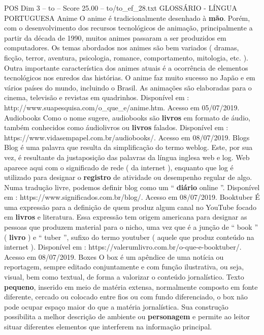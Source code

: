 \begin{textsample}{POS Dim 3 – to – Score 25.00 – to/to\_ef\_28.txt}  \label{ex:f3_pos_105}
GLOSSÁRIO - LÍNGUA PORTUGUESA Anime O anime é tradicionalmente desenhado à \textbf{mão}.
Porém, com o desenvolvimento dos recursos tecnológicos de animação, principalmente a partir da década de 1990, muitos animes passaram a ser produzidos em computadores.
Os temas abordados nos animes são bem variados ( dramas, ficção, terror, aventura, psicologia, romance, comportamento, mitologia, etc. ).
Outra importante característica dos animes atuais é a ocorrência de elementos tecnológicos nos enredos das histórias.
O anime faz muito sucesso no Japão e em vários países do mundo, incluindo o Brasil.
As animações são elaboradas para o cinema, televisão e revistas em quadrinhos.
Disponível em : http://www.suapesquisa.com/o\_que\_e/anime.htm.
Acesso em 05/07/2019.
Audiobooks Como o nome sugere, audiobooks são \textbf{livros} em formato de áudio, também conhecidos como áudiolivros ou \textbf{livros} falados.
Disponível em : https://www.vidasempapel.com.br/audiobooks/.
Acesso em 08/07/2019.
Blogs Blog é uma palavra que resulta da simplificação do termo weblog.
Este, por sua vez, é resultante da justaposição das palavras da língua inglesa web e log.
Web aparece aqui com o significado de rede ( da internet ), enquanto que log é utilizado para designar o \textbf{registro} de atividade ou desempenho regular de algo.
Numa tradução livre, podemos definir blog como um “ \textbf{diário} online ”.
Disponível em : https://www.significados.com.br/blog/.
Acesso em 08/07/2019.
Booktuber É uma expressão para a definição de quem produz algum canal no YouTube focado em \textbf{livros} e literatura.
Essa expressão tem origem americana para designar as pessoas que produzem material para o nicho, uma vez que é a junção de “ book ” ( \textbf{livro} ) e “ tuber ”, sufixo do termo youtuber ( aquele que produz conteúdo na internet ).
Disponível em : https://valerumlivro.com.br/o-que-e-booktuber/.
Acesso em 08/07/2019.
Boxes O box é um apêndice de uma notícia ou reportagem, sempre editado conjuntamente e com função ilustrativa, ou seja, visual, bem como textual, de forma a valorizar o conteúdo jornalístico.
Texto \textbf{pequeno}, inserido em meio de matéria extensa, normalmente composto em fonte diferente, cercado ou colocado entre fios ou com fundo diferenciado, o box não pode ocupar espaço maior do que a matéria jornalística.
Sua construção possibilita a melhor descrição de ambiente ou \textbf{personagem} e permite ao leitor situar diferentes elementos que interferem na informação principal.

\end{textsample}

